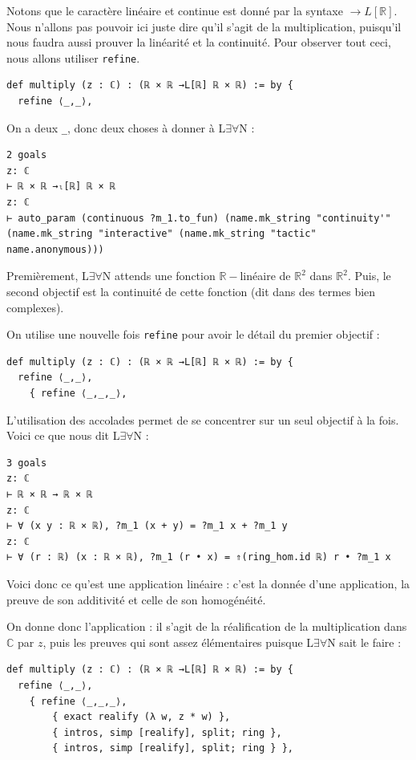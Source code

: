 \documentclass[a4paper, 11pt, twoside]{report}
\newcommand\R{\mathbb{R}}
\newcommand\C{\mathbb{C}}
\newcommand{\LEAN}{L$\exists\forall$N }
\begin{document}
Notons que le caractère linéaire et continue est donné par la syntaxe $\rightarrow L[\R]$. Nous n'allons pas pouvoir ici juste dire qu'il s'agit de la multiplication, puisqu'il nous faudra aussi prouver la linéarité et la continuité. Pour observer tout ceci, nous allons utiliser \verb|refine|.
	
\begin{lstlisting}
def multiply (z : ℂ) : (ℝ × ℝ →L[ℝ] ℝ × ℝ) := by {
  refine ⟨_,_⟩, 
\end{lstlisting}
  
  On a deux \verb|_|, donc deux choses à donner à \LEAN :
  
\begin{lstlisting}
2 goals
z: ℂ
⊢ ℝ × ℝ →ₗ[ℝ] ℝ × ℝ
z: ℂ
⊢ auto_param (continuous ?m_1.to_fun) (name.mk_string "continuity'" (name.mk_string "interactive" (name.mk_string "tactic" name.anonymous)))
\end{lstlisting}

Premièrement, \LEAN attends une fonction $\R-$linéaire de $\R^2$ dans $\R^2$. Puis, le second objectif est la continuité de cette fonction (dit dans des termes bien complexes). 

On utilise une nouvelle fois \verb|refine| pour avoir le détail du premier objectif :

\begin{lstlisting}
def multiply (z : ℂ) : (ℝ × ℝ →L[ℝ] ℝ × ℝ) := by {
  refine ⟨_,_⟩,
  	{ refine ⟨_,_,_⟩, 
\end{lstlisting}
  	
L'utilisation des accolades permet de se concentrer sur un seul objectif à la fois. Voici ce que nous dit \LEAN :

\begin{lstlisting}
3 goals
z: ℂ
⊢ ℝ × ℝ → ℝ × ℝ
z: ℂ
⊢ ∀ (x y : ℝ × ℝ), ?m_1 (x + y) = ?m_1 x + ?m_1 y
z: ℂ
⊢ ∀ (r : ℝ) (x : ℝ × ℝ), ?m_1 (r • x) = ⇑(ring_hom.id ℝ) r • ?m_1 x
\end{lstlisting}

Voici donc ce qu'est une application linéaire : c'est la donnée d'une application, la preuve de son additivité et celle de son homogénéité.

On donne donc l'application : il s'agit de la réalification de la multiplication dans $\C$ par $z$, puis les preuves qui sont assez élémentaires puisque \LEAN sait le faire :

\begin{lstlisting}
def multiply (z : ℂ) : (ℝ × ℝ →L[ℝ] ℝ × ℝ) := by {
  refine ⟨_,_⟩,
  	{ refine ⟨_,_,_⟩,
		{ exact realify (λ w, z * w) },
		{ intros, simp [realify], split; ring },
		{ intros, simp [realify], split; ring } },
\end{lstlisting}
\end{document}
